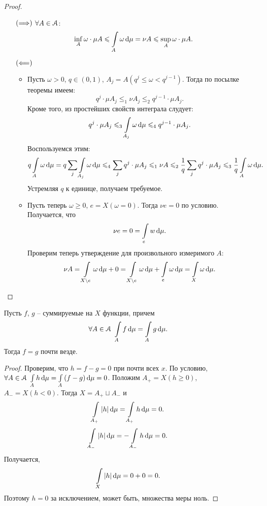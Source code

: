 \begin{proof}
    \enewline
    \begin{itemize}
        \item[$(\Longrightarrow)$] $\forall A \in \mathcal{A}$:
            \[
                \inf_A{\omega} \cdot \mu{A} \leqslant \int\limits_A{\omega \,\mathrm{d}\mu} = \nu{A}
                \leqslant \sup_A{\omega} \cdot \mu{A}
            .\]
        \item[$(\Longleftarrow)$]
            \begin{itemize}
                \item Пусть $\omega > 0$, $q \in (0, 1)$, $A_j = A(q^j \leqslant \omega < q^{j - 1})$.
                    Тогда по посылке теоремы имеем:
                    \[
                        q^j \cdot \mu{A_j} \leqslant_1 \nu{A_j} \leqslant_2 q^{j - 1} \cdot \mu{A_j}
                    .\]
                    Кроме того, из простейших свойств интеграла слудует:
                    \[
                        q^j \cdot \mu{A_j} \leqslant_3 \int\limits_{A_j}{\omega \,\mathrm{d}\mu} 
                        \leqslant_4 q^{j - 1} \cdot \mu{A_j}
                    .\]
                    Воспользуемся этим:
                    \[
                        q \int\limits_A{\omega \,\mathrm{d}\mu} = q \sum_j{\int\limits_{A_j}{\omega \,\mathrm{d}\mu}} \leqslant_4
                        \sum_j{q^j \cdot \mu{A_j}} \leqslant_1 \nu{A} \leqslant_2 \frac{1}{q}
                        \sum_j{q^j \cdot \mu{A_j}} \leqslant_3 \frac{1}{q} \int\limits_A{\omega \,\mathrm{d}\mu}
                    .\]
                    Устремляя $q$ к единице, получаем требуемое.
                \item Пусть теперь $\omega \geqslant 0$, $e = X(\omega = 0)$. Тогда $\nu{e} = 0$ по условию.
                    Получается, что
                    \[
                        \nu{e} = 0 = \int\limits_e{w \,\mathrm{d}\mu}
                    .\]
                    Проверим теперь утверждение для произвольного измеримого $A$:
                    \[
                        \nu{A} = \int\limits_{X \setminus e}{\omega \,\mathrm{d}\mu} + 0 = \int\limits_{X \setminus e}{\omega \,\mathrm{d}\mu}
                        + \int\limits_{e}{\omega \,\mathrm{d}\mu} = \int\limits_X{\omega \,\mathrm{d}\mu}
                    .\]
            \end{itemize}
    \end{itemize}
\end{proof}

\begin{lemma}
    Пусть $f$, $g$ -- суммируемые на $X$ функции, причем
    \[
        \forall A \in \mathcal{A}~ \int\limits_{A}{f \,\mathrm{d}\mu} = \int\limits_{A}{g \,\mathrm{d}\mu}
    .\] 
    Тогда $f = g$ почти везде.
\end{lemma}
\begin{proof}
    Проверим, что $h = f - g = 0$ при почти всех $x$. По условию, $\forall A \in \mathcal{A}~ 
    \int\limits_A{h \,\mathrm{d}\mu} = \int\limits_A{(f - g) \,\mathrm{d}\mu} = 0$. Положим $A_+ = X(h \geqslant 0)$, 
    $A_- = X(h < 0)$. Тогда $X = A_+ \sqcup A_-$ и 
    \[
        \int\limits_{A_+}{|h| \,\mathrm{d}\mu} = \int\limits_{A_+}{h \,\mathrm{d}\mu} = 0
    .\]
    \[
        \int\limits_{A_-}{|h| \,\mathrm{d}\mu} = -\int\limits_{A_-}{h \,\mathrm{d}\mu} = 0
    .\]
    Получается,
    \[
        \int\limits_{X}{|h| \,\mathrm{d}\mu} = 0 + 0 = 0
    .\]
    Поэтому $h = 0$ за исключением, может быть, множества меры ноль.
\end{proof}

